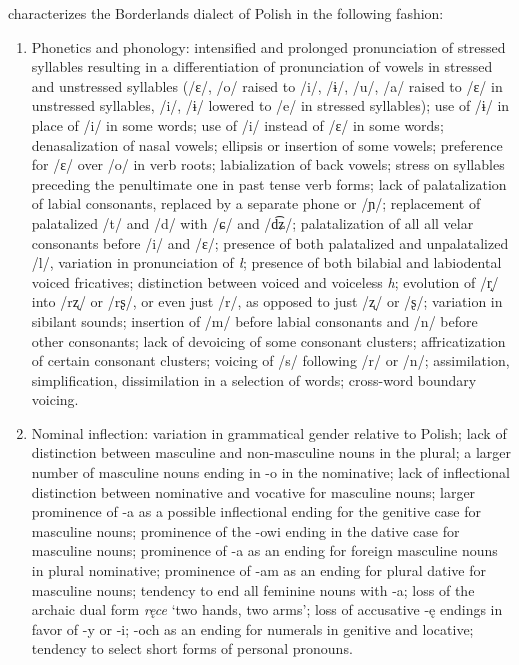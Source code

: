\citet{kurzowa_1983} characterizes the Borderlands dialect of Polish in the following fashion:
\begin{enumerate}
    \item Phonetics and phonology: intensified and prolonged pronunciation of stressed syllables resulting in a differentiation of pronunciation of vowels in stressed and unstressed syllables (/ɛ/, /o/ raised to /i/, /ɨ/, /u/, /a/ raised to /ɛ/ in unstressed syllables, /i/, /ɨ/ lowered to /e/ in stressed syllables); use of /ɨ/ in place of /i/ in some words; use of /i/ instead of /ɛ/ in some words; denasalization of nasal vowels; ellipsis or insertion of some vowels; preference for /ɛ/ over /o/ in verb roots; labialization of back vowels; stress on syllables preceding the penultimate one in past tense verb forms; lack of palatalization of labial consonants, replaced by a separate phone or /ɲ/; replacement of palatalized /t/ and /d/ with /ɕ/ and /d͡ʑ/; palatalization of all all velar consonants before /i/ and /ɛ/; presence of both palatalized and unpalatalized /l/, variation in pronunciation of \textit{ł}; presence of both bilabial and labiodental voiced fricatives; distinction between voiced and voiceless \textit{h}; evolution of /r̝/ into /rʐ/ or /rʂ/, or even just /r/, as opposed to just /ʐ/ or /ʂ/; variation in sibilant sounds; insertion of /m/ before labial consonants and /n/ before other consonants; lack of devoicing of some consonant clusters; affricatization of certain consonant clusters; voicing of /s/ following /r/ or /n/; assimilation, simplification, dissimilation in a selection of words; cross-word boundary voicing.
    
    \item Nominal inflection: variation in grammatical gender relative to Polish; lack of distinction between masculine and non-masculine nouns in the plural; a larger number of masculine nouns ending in -o in the nominative; lack of inflectional distinction between nominative and vocative for masculine nouns; larger prominence of -a as a possible inflectional ending for the genitive case for masculine nouns; prominence of the -owi ending in the dative case for masculine nouns; prominence of -a as an ending for foreign masculine nouns in plural nominative; prominence of -am as an ending for plural dative for masculine nouns; tendency to end all feminine nouns with -a; loss of the archaic dual form \textit{ręce} `two hands, two arms'; loss of accusative -ę endings in favor of -y or -i; -och as an ending for numerals in genitive and locative; tendency to select short forms of personal pronouns.
    

\end{enumerate}
